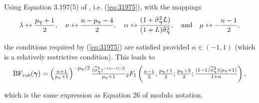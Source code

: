 \noindent 
Using Equation 3.197(5) of \cite{Gradshteyn2007}, i.e. (\ref{eq:31975}), 
with the mappings
$$
\lambda \leftrightarrow \frac{p_{\boldsymbol \gamma}+1}{2},
\quad 
\nu \leftrightarrow \frac{n - p_{\boldsymbol \gamma} - 4}{2},
\quad 
\alpha \leftrightarrow \frac{(1 + \widehat{\sigma}_{\boldsymbol \gamma}^2 L)}{(1 + L)\widehat{\sigma}_{\boldsymbol \gamma}^2},
\quad \mbox{and} \quad 
\mu \leftrightarrow -\frac{n-1}{2},
$$

\noindent the conditions required by (\ref{eq:31975}) are satisfied provided
$\alpha \in (-1,1)$ (which is a relatively restrictive condition). 
%
%
This leads to
\begin{equation}\label{eq:yGivenGammaRobust}
	\displaystyle \mbox{BF}_{{rob}}({\boldsymbol \gamma})
	= \left( \tfrac{n + 1}{ p_{\boldsymbol \gamma} + 1} \right)^{ - p_{\boldsymbol \gamma}/2} \tfrac{(\widehat{\sigma}_{\boldsymbol \gamma}^2)^{-(n-1)/2}}{p_{\boldsymbol \gamma}+1}
	{}_2F_1\left( \tfrac{n-1}{2}, \tfrac{p_{\boldsymbol \gamma}+1}{2}; \tfrac{p_{\boldsymbol \gamma}+3}{2}  ; 
	\tfrac{(1  - 1/\widehat{\sigma}_{\boldsymbol \gamma}^2)(p_{\boldsymbol \gamma} + 1)}{1 + n}  \right),
\end{equation}


\noindent which is the same expression as Equation 26 of \cite{Bayarri2012}
modulo notation.

